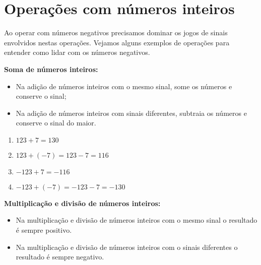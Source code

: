 
 \section{Operações com números inteiros}%

 Ao operar com números negativos precisamos dominar os jogos de sinais envolvidos nestas operações. Vejamos alguns exemplos de operações para entender como lidar com os números negativos.

 \begin{obs}
 \textbf{Soma de números inteiros:}
 \begin{itemize}
  \item Na adição de números inteiros com o mesmo sinal, some os números e conserve o sinal;
  \item Na adição de números inteiros com sinais diferentes, subtraia os números e conserve o sinal do maior.
 \end{itemize}
 \end{obs}

  \begin{enumerate}[1)]
   \item $123 + 7= 130$
   \item $123 + (- 7) = 123 - 7 = 116$
   \item $-123 + 7 = -116$
   \item $-123 + (- 7) = -123 - 7 = -130$
 \end{enumerate}



\begin{obs}
 \textbf{Multiplicação e divisão de números inteiros:}
  \begin{itemize}
   \item Na multiplicação e divisão de números inteiros com o mesmo sinal o resultado é sempre positivo.
   \item Na multiplicação e divisão de números inteiros com o sinais diferentes o resultado é sempre negativo.
  \end{itemize}
\end{obs}

